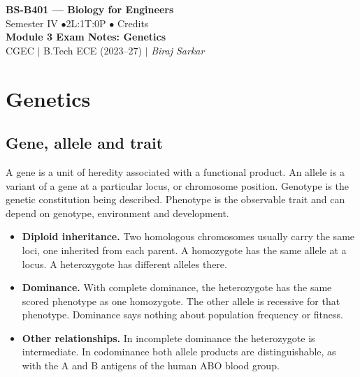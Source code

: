 \documentclass[12pt,a4paper]{article}
\begin{document}
\begin{center}
  {\LARGE\bfseries\color{myred} BS-B401 --- Biology for Engineers}\\[5pt]
  {\normalsize\color{mydark} Semester IV \quad$\bullet$\quad 2L:1T:0P \quad$\bullet$ Credits}\\[3pt]
  {\normalsize\color{myteal}\textbf{Module 3 Exam Notes: Genetics}}\\[3pt]
  {\small\color{mydark} CGEC \;$|$\; B.Tech ECE (2023--27) \;$|$\; \textit{Biraj Sarkar}}
\end{center}
\vspace{2pt}
\noindent{\color{myred}\rule{\linewidth}{1.5pt}}
\vspace{2pt}

\hypersetup{linkcolor=mydark}
\tableofcontents
\hypersetup{linkcolor=myteal}
\newpage

\section{Genetics}
\subsection{Gene, allele and trait}
\begin{tcolorbox}[defbox, title={Foundations of heredity}]
A gene is a unit of heredity associated with a functional product. An allele is a variant of a gene at a particular locus, or chromosome position. Genotype is the genetic constitution being described. Phenotype is the observable trait and can depend on genotype, environment and development.
\end{tcolorbox}

\begin{itemize}[leftmargin=*, itemsep=3pt, topsep=4pt]
  \item \textbf{Diploid inheritance.} Two homologous chromosomes usually carry the same loci, one inherited from each parent. A homozygote has the same allele at a locus. A heterozygote has different alleles there.
  \item \textbf{Dominance.} With complete dominance, the heterozygote has the same scored phenotype as one homozygote. The other allele is recessive for that phenotype. Dominance says nothing about population frequency or fitness.
  \item \textbf{Other relationships.} In incomplete dominance the heterozygote is intermediate. In codominance both allele products are distinguishable, as with the A and B antigens of the human ABO blood group.
\end{itemize}
\end{document}
